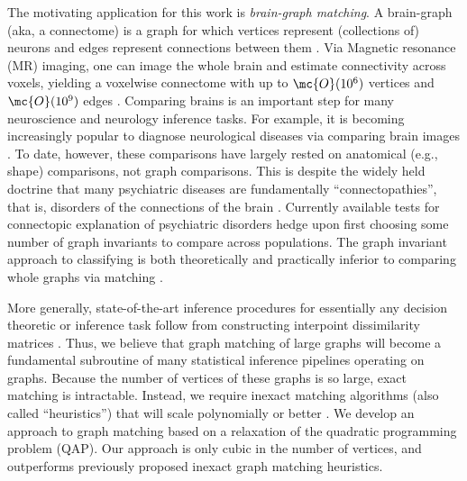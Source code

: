 \documentclass[10pt,journal,cspaper,compsoc]{IEEEtran}
\begin{document}
The motivating application for this work is \emph{brain-graph matching}.  A brain-graph (aka, a connectome) is a graph for which vertices represent (collections of) neurons and edges represent connections between them \cite{SpornsKotter05, Hagmann05}. Via  Magnetic resonance (MR) imaging, one can image the whole brain and estimate connectivity across voxels, yielding a voxelwise connectome with up to $\mc{O}(10^6)$ vertices and $\mc{O}(10^9)$ edges \cite{Zuo2011}.  Comparing brains is an important step for many neuroscience and neurology inference tasks.  For example, it is becoming increasingly popular to diagnose neurological diseases via comparing brain images \cite{Csernansky2004}.  To date, however, these comparisons have largely rested on anatomical (e.g., shape) comparisons, not graph comparisons.  This is despite the widely held doctrine that many
psychiatric diseases are fundamentally ``connectopathies'', that is, disorders of the connections of the brain \cite{Kubicki2007,Calhoun2011,Fornito2012,Fornito2012a}. Currently available tests for connectopic explanation of psychiatric disorders  hedge upon first choosing some number of graph invariants to compare across populations. The graph invariant approach to classifying is both theoretically and practically inferior to comparing whole graphs via matching \cite{VP11_unlabeled}.  

More generally, state-of-the-art inference procedures for essentially any decision theoretic or inference task follow from constructing interpoint dissimilarity matrices \cite{Duin2011}.  Thus, we believe that graph matching of large graphs will become a fundamental subroutine of many statistical inference pipelines operating on graphs. Because the number of vertices of these graphs is so large, exact matching is intractable.   Instead, we require inexact matching algorithms (also called ``heuristics'') that will scale polynomially or better \cite{Conte2004}.  We develop an approach to graph matching based on a relaxation of the quadratic programming problem (QAP).  Our approach is only cubic in the number of vertices, and outperforms previously proposed inexact graph matching heuristics.  



\end{document}
